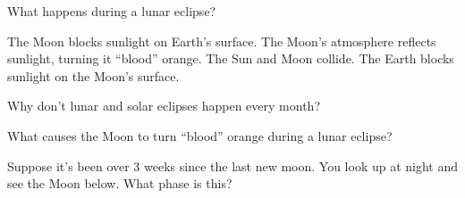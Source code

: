 \documentclass[addpoints]{exam}
\begin{document}
\begin{questions}

\clearpage
\question
What happens during a lunar eclipse?

\begin{choices}
    \choice The Moon blocks sunlight on Earth's surface.
    \choice The Moon's atmosphere reflects sunlight, turning it ``blood'' orange.
    \choice The Sun and Moon collide.
    \correctchoice The Earth blocks sunlight on the Moon's surface.
\end{choices}

\question
Why don't lunar and solar eclipses happen every month?


\question 
What causes the Moon to turn ``blood'' orange during a lunar eclipse?


\question
Suppose it's been over 3 weeks since the last new moon. You look up at night and see the Moon below. What phase is this?


\end{questions}
\end{document}
